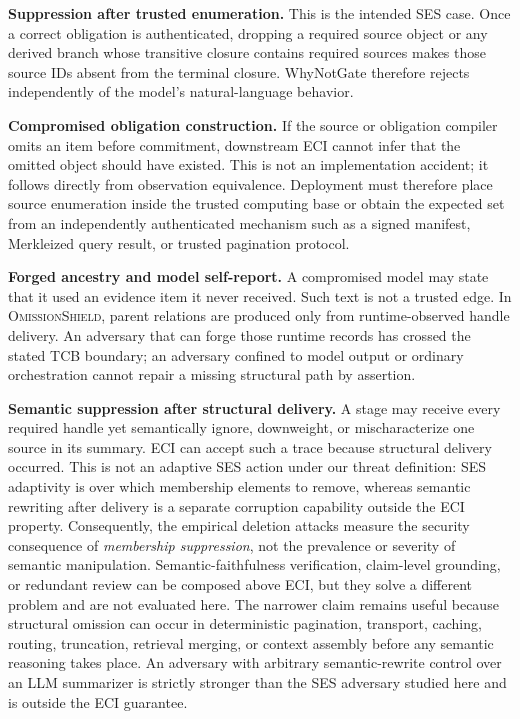 \documentclass[journal,compsoc]{IEEEtran}
\newcommand{\system}{\textsc{OmissionShield}}
\begin{document}
\noindent\textbf{Suppression after trusted enumeration.}
This is the intended SES case. Once a correct obligation is authenticated, dropping a required source object or any derived branch whose transitive closure contains required sources makes those source IDs absent from the terminal closure. WhyNotGate therefore rejects independently of the model's natural-language behavior.

\noindent\textbf{Compromised obligation construction.}
If the source or obligation compiler omits an item before commitment, downstream ECI cannot infer that the omitted object should have existed. This is not an implementation accident; it follows directly from observation equivalence. Deployment must therefore place source enumeration inside the trusted computing base or obtain the expected set from an independently authenticated mechanism such as a signed manifest, Merkleized query result, or trusted pagination protocol.

\noindent\textbf{Forged ancestry and model self-report.}
A compromised model may state that it used an evidence item it never received. Such text is not a trusted edge. In \system, parent relations are produced only from runtime-observed handle delivery. An adversary that can forge those runtime records has crossed the stated TCB boundary; an adversary confined to model output or ordinary orchestration cannot repair a missing structural path by assertion.

\noindent\textbf{Semantic suppression after structural delivery.}
A stage may receive every required handle yet semantically ignore, downweight, or mischaracterize one source in its summary. ECI can accept such a trace because structural delivery occurred. This is not an adaptive SES action under our threat definition: SES adaptivity is over which membership elements to remove, whereas semantic rewriting after delivery is a separate corruption capability outside the ECI property. Consequently, the empirical deletion attacks measure the security consequence of \emph{membership suppression}, not the prevalence or severity of semantic manipulation. Semantic-faithfulness verification, claim-level grounding, or redundant review can be composed above ECI, but they solve a different problem and are not evaluated here. The narrower claim remains useful because structural omission can occur in deterministic pagination, transport, caching, routing, truncation, retrieval merging, or context assembly before any semantic reasoning takes place. An adversary with arbitrary semantic-rewrite control over an LLM summarizer is strictly stronger than the SES adversary studied here and is outside the ECI guarantee.
\end{document}
